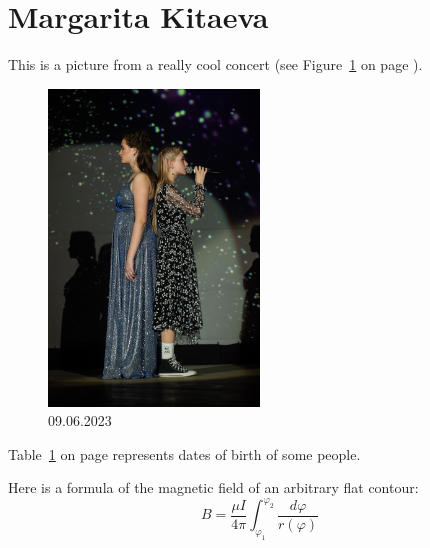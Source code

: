 \section{Margarita Kitaeva}
\label{sec:Margarita Kitaeva}

This is a picture from a really cool concert (see Figure~\ref{fig:concert} on page \pageref{fig:concert}).

\begin{figure}[htbp]
    \centering
    \includegraphics[width=0.5\textwidth]{pictures/concert.JPG}
    \caption{09.06.2023}
    \label{fig:concert}
\end{figure}

Table~\ref{sec:Margarita Kitaeva} on page \pageref{sec:Margarita Kitaeva} represents dates of birth of some people.


Here is a formula of the magnetic field of an arbitrary flat contour: \[B = \frac{\mu I}{4\pi }\int_{\varphi _1}^{\varphi _2} \frac{d\varphi}{r(\varphi)}\]

